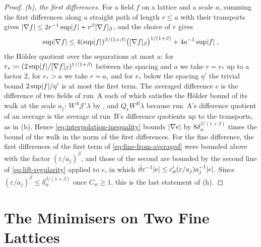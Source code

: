 \documentclass[11pt]{preprint}
\DeclarePairedDelimiter{\abs}{\lvert}{\rvert}
\numberwithin{equation}{section}
\theoremstyle{definition}
\theoremstyle{remark}
\theoremstyle{plain}
\begin{document}
\begin{proof}
\emph{(h), the first differences.} For a field $f$ on a lattice and a scale $a$, summing the first differences along a straight path of length $r \leq a$ with their transports gives $\abs{\nabla f} \leq 2r^{-1}\sup\abs f + r^\beta[\nabla f]_\beta$, and the choice of $r$ gives
\begin{equation}\label{eq:interpolation-inequality}
    \sup\abs{\nabla f} \leq 4(\sup\abs f)^{\beta/(1+\beta)}\bigl([\nabla f]_\beta\bigr)^{1/(1+\beta)} + 4a^{-1}\sup\abs f\;,
\end{equation}
the H\"older quotient over the separations at most $a$: for $r_* \coloneqq (2\sup\abs f/[\nabla f]_\beta)^{1/(1+\beta)}$ between the spacing and $a$ we take $r = r_*$ up to a factor $2$, for $r_* > a$ we take $r = a$, and for $r_*$ below the spacing $\eta'$ the trivial bound $2\sup\abs f/\eta'$ is at most the first term. The averaged difference $e$ is the difference of two fields of run~A each of which satisfies the H\"older bound of its walk at the scale $a_j$: $W^A\mathcal J'\lambda$ by \cite[(3.108)]{BalabanPBG}, and $Q_1W^B\lambda$ because run~A's difference quotient of an average is the average of run~B's difference quotients up to the transports, as in (b). Hence \eqref{eq:interpolation-inequality} bounds $\abs{\nabla e}$ by $8\delta_w^{\beta/(1+\beta)}$ times the bound of the walk in the norm of the first differences. For the fine difference, the first differences of the first term of \eqref{eq:fine-from-averaged} were bounded above with the factor $(\varepsilon/a_j)^\beta$, and those of the second are bounded by the second line of \eqref{eq:lift-regularity} applied to $e$, in which $\bar\vartheta\varepsilon^{-1}\abs e \leq c'_\vartheta(\varepsilon/a_j)a_j^{-1}\abs e$. Since $(\varepsilon/a_j)^\beta \leq \delta_w^{\beta/(1+\beta)}$ once $C_w \geq 1$, this is the last statement of (h).
\end{proof}

\section{The Minimisers on Two Fine Lattices}\label{sec:minimisers}
\end{document}
